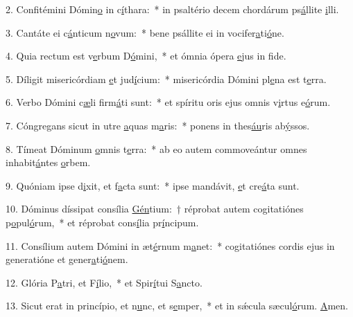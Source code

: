2. Confitémini Dómin\uline{o} in c\uline{í}thara:~* in psaltério decem chordárum ps\uline{á}llite \uline{i}lli.\par 
3. Cantáte ei c\uline{á}nticum n\uline{o}vum:~* bene psállite ei in vocifer\uline{a}ti\uline{ó}ne.\par 
4. Quia rectum est v\uline{e}rbum D\uline{ó}mini,~* et ómnia ópera \uline{e}jus in f\uline{i}de.\par 
5. Díligit misericórdiam \uline{e}t jud\uline{í}cium:~* misericórdia Dómini pl\uline{e}na est t\uline{e}rra.\par 
6. Verbo Dómini c\uline{æ}li firm\uline{á}ti sunt:~* et spíritu oris ejus omnis v\uline{i}rtus e\uline{ó}rum.\par 
7. Cóngregans sicut in utre \uline{a}quas m\uline{a}ris:~* ponens in thes\uline{áu}ris ab\uline{ý}ssos.\par 
8. Tímeat Dóminum \uline{o}mnis t\uline{e}rra:~* ab eo autem commoveántur omnes inhabit\uline{á}ntes \uline{o}rbem.\par 
9. Quóniam ipse d\uline{i}xit, et f\uline{a}cta sunt:~* ipse mandávit, \uline{e}t cre\uline{á}ta sunt.\par 
10. Dóminus díssipat consília \uline{Gén}tium:~† réprobat autem cogitatiónes p\uline{o}pul\uline{ó}rum,~* et réprobat cons\uline{í}lia pr\uline{í}ncipum.\par 
11. Consílium autem Dómini in æt\uline{é}rnum m\uline{a}net:~* cogitatiónes cordis ejus in generatióne et gener\uline{a}ti\uline{ó}nem.\par 
12. Glória P\uline{a}tri, et F\uline{í}lio,~* et Spir\uline{í}tui S\uline{a}ncto.\par 
13. Sicut erat in princípio, et n\uline{u}nc, et s\uline{e}mper,~* et in sǽcula sæcul\uline{ó}rum. \uline{A}men.\par 
